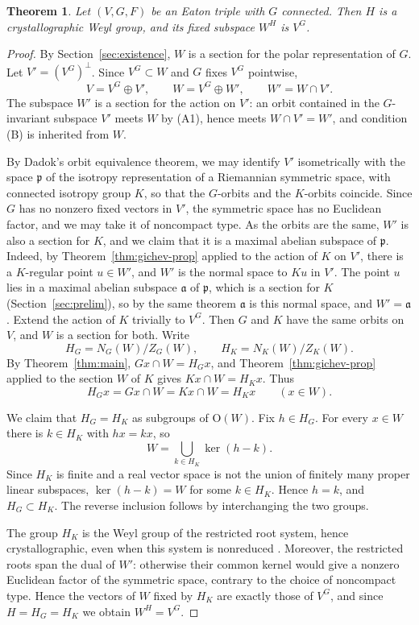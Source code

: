 \documentclass[11pt]{amsart}
\theoremstyle{plain}
\newtheorem{theorem}{Theorem}[section]
\theoremstyle{definition}
\theoremstyle{remark}
\newcommand{\fa}{\mathfrak a}
\newcommand{\fp}{\mathfrak p}
\begin{document}
\begin{theorem}\label{thm:connected}
Let $(V,G,F)$ be an Eaton triple with $G$ connected. Then $H$ is a crystallographic Weyl group, and its fixed subspace $W^H$ is $V^G$.
\end{theorem}
\begin{proof}
By Section~\ref{sec:existence}, $W$ is a section for the polar representation of $G$. Let $V'=(V^G)^\perp$. Since $V^G\subset W$ and $G$ fixes $V^G$ pointwise,
\[
V=V^G\oplus V',\qquad W=V^G\oplus W',\qquad W'=W\cap V'.
\]
The subspace $W'$ is a section for the action on $V'$: an orbit contained in the $G$-invariant subspace $V'$ meets $W$ by (A1), hence meets $W\cap V'=W'$, and condition (B) is inherited from $W$.

By Dadok's orbit equivalence theorem, we may identify $V'$ isometrically with the space $\fp$ of the isotropy representation of a Riemannian symmetric space, with connected isotropy group $K$, so that the $G$-orbits and the $K$-orbits coincide. Since $G$ has no nonzero fixed vectors in $V'$, the symmetric space has no Euclidean factor, and we may take it of noncompact type. As the orbits are the same, $W'$ is also a section for $K$, and we claim that it is a maximal abelian subspace of $\fp$. Indeed, by Theorem~\ref{thm:gichev-prop} applied to the action of $K$ on $V'$, there is a $K$-regular point $u\in W'$, and $W'$ is the normal space to $Ku$ in $V'$. The point $u$ lies in a maximal abelian subspace $\fa$ of $\fp$, which is a section for $K$ (Section~\ref{sec:prelim}), so by the same theorem $\fa$ is this normal space, and $W'=\fa$. Extend the action of $K$ trivially to $V^G$. Then $G$ and $K$ have the same orbits on $V$, and $W$ is a section for both. Write
\[
H_G=N_G(W)/Z_G(W),\qquad H_K=N_K(W)/Z_K(W).
\]
By Theorem~\ref{thm:main}, $Gx\cap W=H_Gx$, and Theorem~\ref{thm:gichev-prop} applied to the section $W$ of $K$ gives $Kx\cap W=H_Kx$. Thus
\[
H_Gx=Gx\cap W=Kx\cap W=H_Kx\qquad(x\in W).
\]

We claim that $H_G=H_K$ as subgroups of $\mathrm{O}(W)$. Fix $h\in H_G$. For every $x\in W$ there is $k\in H_K$ with $hx=kx$, so
\[
W=\bigcup_{k\in H_K}\ker(h-k).
\]
Since $H_K$ is finite and a real vector space is not the union of finitely many proper linear subspaces, $\ker(h-k)=W$ for some $k\in H_K$. Hence $h=k$, and $H_G\subset H_K$. The reverse inclusion follows by interchanging the two groups.

The group $H_K$ is the Weyl group of the restricted root system, hence crystallographic, even when this system is nonreduced \cite[Ch.~VII]{Helgason}. Moreover, the restricted roots span the dual of $W'$: otherwise their common kernel would give a nonzero Euclidean factor of the symmetric space, contrary to the choice of noncompact type. Hence the vectors of $W$ fixed by $H_K$ are exactly those of $V^G$, and since $H=H_G=H_K$ we obtain $W^H=V^G$.
\end{proof}
\end{document}
